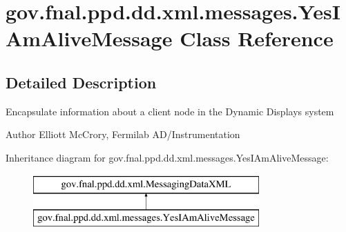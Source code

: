 \hypertarget{classgov_1_1fnal_1_1ppd_1_1dd_1_1xml_1_1messages_1_1YesIAmAliveMessage}{\section{gov.\-fnal.\-ppd.\-dd.\-xml.\-messages.\-Yes\-I\-Am\-Alive\-Message Class Reference}
\label{classgov_1_1fnal_1_1ppd_1_1dd_1_1xml_1_1messages_1_1YesIAmAliveMessage}
}


\subsection{Detailed Description}
Encapsulate information about a client node in the Dynamic Displays system

\begin{DoxyAuthor}{Author}
Elliott Mc\-Crory, Fermilab A\-D/\-Instrumentation 
\end{DoxyAuthor}
Inheritance diagram for gov.\-fnal.\-ppd.\-dd.\-xml.\-messages.\-Yes\-I\-Am\-Alive\-Message\-:\begin{figure}[H]
\begin{center}
\leavevmode
\includegraphics[height=2.000000cm]{classgov_1_1fnal_1_1ppd_1_1dd_1_1xml_1_1messages_1_1YesIAmAliveMessage}
\end{center}
\end{figure}
